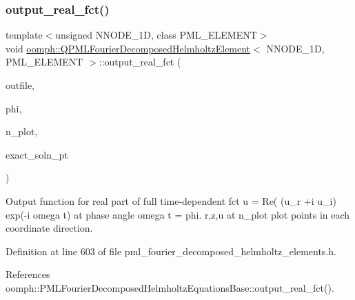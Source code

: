 \subsubsection{\texorpdfstring{output\+\_\+real\+\_\+fct()}{output\_real\_fct()}}
{\footnotesize\ttfamily template$<$unsigned N\+N\+O\+D\+E\+\_\+1D, class P\+M\+L\+\_\+\+E\+L\+E\+M\+E\+NT$>$ \\
void \hyperlink{classoomph_1_1QPMLFourierDecomposedHelmholtzElement}{oomph\+::\+Q\+P\+M\+L\+Fourier\+Decomposed\+Helmholtz\+Element}$<$ N\+N\+O\+D\+E\+\_\+1D, P\+M\+L\+\_\+\+E\+L\+E\+M\+E\+NT $>$\+::output\+\_\+real\+\_\+fct (\begin{DoxyParamCaption}\item[{std\+::ostream \&}]{outfile,  }\item[{const double \&}]{phi,  }\item[{const unsigned \&}]{n\+\_\+plot,  }\item[{\hyperlink{classoomph_1_1FiniteElement_a690fd33af26cc3e84f39bba6d5a85202}{Finite\+Element\+::\+Steady\+Exact\+Solution\+Fct\+Pt}}]{exact\+\_\+soln\+\_\+pt }\end{DoxyParamCaption})\hspace{0.3cm}{\ttfamily [inline]}}



Output function for real part of full time-\/dependent fct u = Re( (u\+\_\+r +i u\+\_\+i) exp(-\/i omega t) at phase angle omega t = phi. r,z,u at n\+\_\+plot plot points in each coordinate direction. 



Definition at line 603 of file pml\+\_\+fourier\+\_\+decomposed\+\_\+helmholtz\+\_\+elements.\+h.



References oomph\+::\+P\+M\+L\+Fourier\+Decomposed\+Helmholtz\+Equations\+Base\+::output\+\_\+real\+\_\+fct().

\mbox{\label{classoomph_1_1QPMLFourierDecomposedHelmholtzElement_aebd313b676658a01062731cfa824829a}} 
